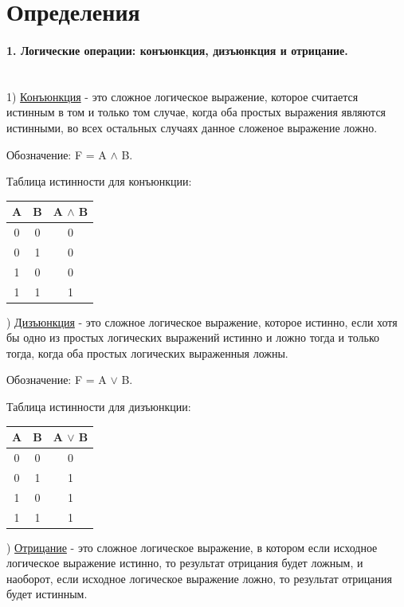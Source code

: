 \documentclass[a4paper, 12pt]{article}
\newcommand{\parag}[1]{\paragraph{#1}\mbox{}\\}
\begin{document}
\section{Определения}

\parag{1. Логические операции: конъюнкция, дизъюнкция и отрицание.}
1) \underline{Конъюнкция} - это сложное логическое выражение, которое считается истинным в том и только том случае, когда оба простых выражения являются истинными, во всех остальных случаях данное сложеное выражение ложно.

Обозначение: F = A $\land$ B.

Таблица истинности для конъюнкции:

\begin{center}
    \begin{tabular}{|c|c|c|}
        \hline
        A & B & A $\land$ B  \\
        \hline
        0 & 0 & 0  \\
         \hline
        0 & 1 & 0  \\
        \hline
        1 & 0 & 0 \\
        \hline
        1 & 1 & 1 \\
        \hline
    \end{tabular}
\end{center}

) \underline{Дизъюнкция} - это сложное логическое выражение, которое истинно, если хотя бы одно из простых логических выражений истинно и ложно тогда и только тогда, когда оба простых логических выраженныя ложны.

Обозначение: F = A $\vee$ B.

Таблица истинности для дизъюнкции:

\begin{center}
    \begin{tabular}{|c|c|c|}
        \hline
        A & B & A $\vee$ B  \\
        \hline
        0 & 0 & 0  \\
         \hline
        0 & 1 & 1  \\
        \hline
        1 & 0 & 1 \\
        \hline
        1 & 1 & 1 \\
        \hline
    \end{tabular}
\end{center}

) \underline{Отрицание}  - это сложное логическое выражение, в котором если исходное логическое выражение истинно, то результат отрицания будет ложным, и наоборот, если исходное логическое выражение ложно, то результат отрицания будет истинным.
\end{document}
